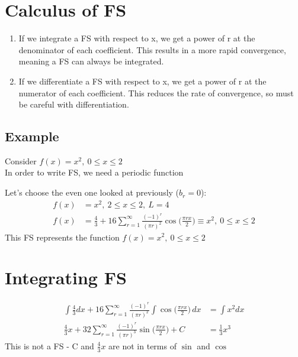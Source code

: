 \documentclass[a4paper, 11pt, normalem]{report}
\begin{document}
\section{Calculus of FS}
\begin{enumerate}
    \item If we integrate a FS with respect to x, we get a power of r at the denominator of each coefficient. This results in a more rapid convergence, meaning a FS can always be integrated.
    \item If we differentiate a FS with respect to x, we get a power of r at the numerator of each coefficient. This reduces the rate of convergence, so must be careful with differentiation.
\end{enumerate}

\subsection{Example}
Consider $f(x) = x^2,~ 0 \leq x \leq 2$ \\
In order to write FS, we need a periodic function

Let's choose the even one looked at previously ($b_r = 0$):
\begin{align*}
    f(x) &= x^2,~ 2 \leq x \leq 2,~ L = 4 \\
    f(x) &= \frac{4}{3} + 16\sum_{r = 1}^{\infty} \frac{(-1)^r}{(\pi r)^2}\cos\Big(\frac{\pi rx}{2}\Big) \equiv x^2,~ 0 \leq x \leq 2
\end{align*}
This FS represents the function $f(x) = x^2,~ 0 \leq x \leq 2$

\section{Integrating FS}
\begin{align*}
    \int \frac{4}{3}dx + 16\sum_{r = 1}^{\infty} \frac{(-1)^r}{(\pi r)^2} \int \cos\Big(\frac{\pi rx}{2}\Big)\,dx &= \int x^2 dx \\
    \frac{4}{3}x + 32\sum_{r = 1}^{\infty} \frac{(-1)^r}{(\pi r)^3}\sin\Big(\frac{\pi rx}{2}\Big) + C &= \frac{1}{3}x^3
\end{align*}
This is not a FS - C and $\frac{4}{3}x$ are not in terms of $\sin$ and $\cos$
\end{document}
